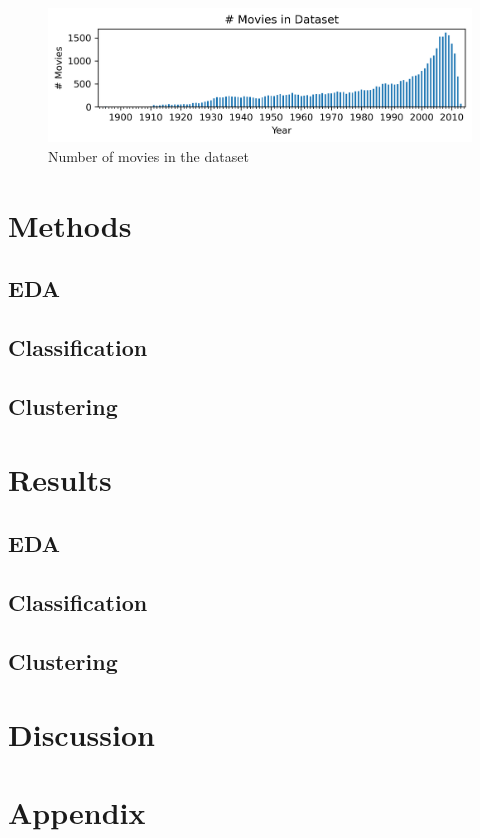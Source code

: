 \documentclass[hidelinks]{article}
\begin{document}
\begin{figure}[h]
\centering
\caption{Number of movies in the dataset}
\includegraphics[width=5in]{figures/number_movies_per_year_bar_chart.png}
\end{figure}
\begin{multicols}{2}

\section{Methods}
\subsection{EDA}
\subsection{Classification}
\subsection{Clustering}

\section{Results}
\subsection{EDA}
\subsection{Classification}
\subsection{Clustering}

\section{Discussion}
\end{multicols}

\nocite{10.1145/2723372.2751523}



\section{Appendix}
\end{document}
